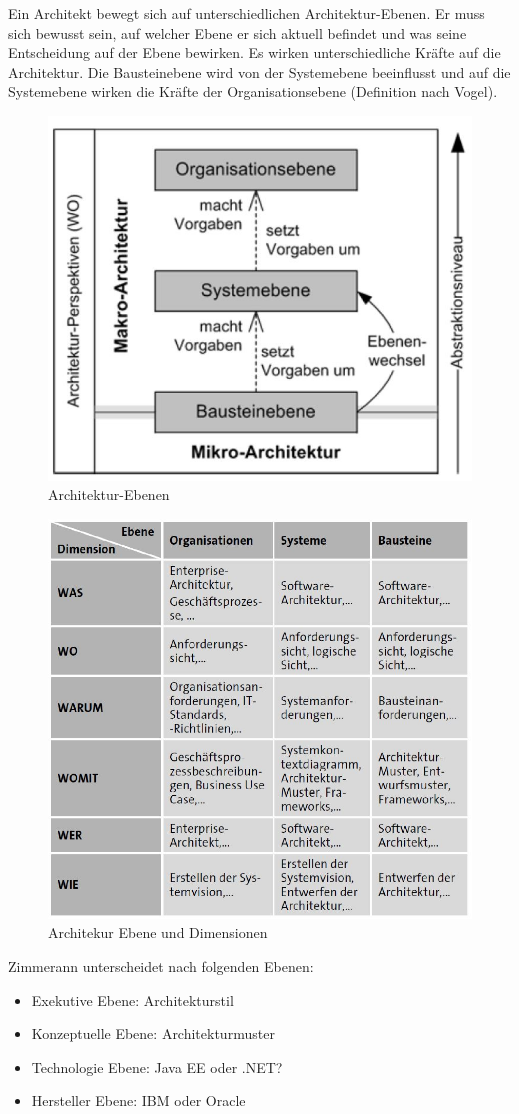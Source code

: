 Ein Architekt bewegt sich auf unterschiedlichen Architektur-Ebenen. Er muss sich bewusst sein, auf welcher Ebene er sich aktuell befindet und was seine Entscheidung auf der Ebene bewirken. Es wirken unterschiedliche Kräfte auf die Architektur. Die Bausteinebene wird von der Systemebene beeinflusst und auf die Systemebene wirken die Kräfte der Organisationsebene (Definition nach Vogel).

\begin{figure}[h!]
\centering
\includegraphics[width=0.5\linewidth]{fig/architekur-ebenen}
\caption{Architektur-Ebenen}
\label{fig:architekur-ebenen}
\end{figure}

\begin{figure}[h!]
\centering
\includegraphics[width=0.5\linewidth]{fig/architekur-ebenen-und-dimensionen}
\caption{Architekur Ebene und Dimensionen}
\label{fig:architekur-ebenen-und-dimensionen}
\end{figure}

Zimmerann unterscheidet nach folgenden Ebenen:
\begin{itemize}
	\item Exekutive Ebene: Architekturstil
	\item Konzeptuelle Ebene: Architekturmuster
	\item Technologie Ebene: Java EE oder .NET?
	\item Hersteller Ebene: IBM oder Oracle
\end{itemize}

